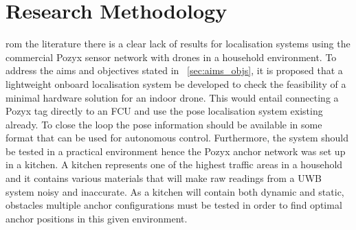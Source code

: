 \chapter{Research Methodology}\label{ch:research-methodology}
rom the literature there is a clear lack of results for localisation systems using the commercial Pozyx sensor network with drones in a household environment.
To address the aims and objectives stated in ~\ref{sec:aims_objs}, it is proposed that a lightweight onboard localisation system be developed to check the feasibility of a minimal hardware solution for an indoor drone.
This would entail connecting a Pozyx tag directly to an FCU and use the pose localisation system existing already.
To close the loop the pose information should be available in some format that can be used for autonomous control.
Furthermore, the system should be tested in a practical environment hence the Pozyx anchor network was set up in a kitchen.
A kitchen represents one of the highest traffic areas in a household and it contains various materials that will make raw readings from a UWB system noisy and inaccurate.
As a kitchen will contain both dynamic and static, obstacles multiple anchor configurations must be tested in order to find optimal anchor positions in this given environment.

